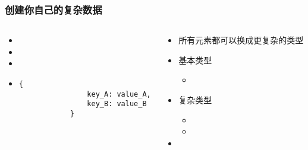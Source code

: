 \begin{frame} [fragile]
	\frametitle{创建你自己的复杂数据}
	\linespread{1.5}
	\begin{columns}[T]
		\begin{column}[T]{.5\textwidth}
			\begin{itemize}
			\item {}
			\item \inlinePython{[a, b, c]}
			\item {}
			\item
			\begin{lstlisting}[style=pythonstyle, gobble=12]
			{
				key_A: value_A,
				key_B: value_B
			}
			\end{lstlisting}
			\end{itemize}
		\end{column}
		\begin{column}[T]{.5\textwidth}
			\begin{itemize}
			\item 所有元素都可以换成更复杂的类型
			\item 基本类型
				\begin{itemize}
				\item {}
				\end{itemize}
			\item 复杂类型
				\begin{itemize}
				\item {}
				\item {}
				\end{itemize}
			\item {}
			\end{itemize}
		\end{column}
	\end{columns}
\end{frame}

